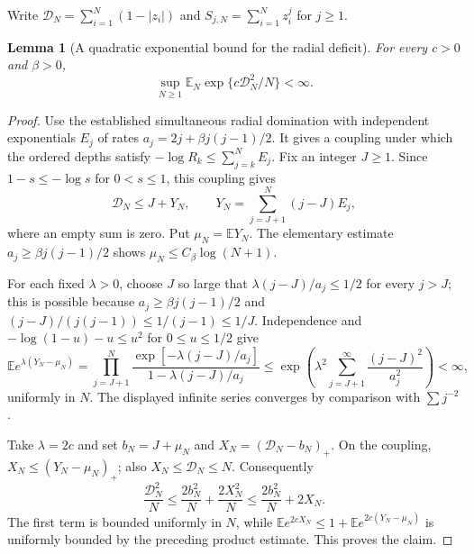 \documentclass[11pt,a4paper]{article}
\numberwithin{equation}{section}
\newtheorem{lemma}[theorem]{Lemma}
\theoremstyle{definition}
\theoremstyle{remark}
\newcommand{\E}{\mathbb E}
\begin{document}
Write $\mathcal D_N=\sum_{i=1}^N(1-|z_i|)$ and
$S_{j,N}=\sum_{i=1}^N z_i^j$ for $j\geq1$.

\begin{lemma}[A quadratic exponential bound for the radial deficit]
\label{lem:deficit-quadratic-exponential}
For every $c>0$ and $\beta>0$,
\[
 \sup_{N\geq1}\E_N\exp\{c\mathcal D_N^2/N\}<\infty.
\]
\end{lemma}
\begin{proof}
Use the established simultaneous radial domination with independent
exponentials $E_j$ of rates $a_j=2j+\beta j(j-1)/2$. It gives a coupling
under which the ordered depths satisfy
$-\log R_k\leq\sum_{j=k}^N E_j$. Fix an integer $J\geq1$. Since
$1-s\leq-\log s$ for $0<s\leq1$, this coupling gives
\[
 \mathcal D_N\leq J+Y_N,
 \qquad Y_N=\sum_{j=J+1}^N(j-J)E_j,
\]
where an empty sum is zero. Put $\mu_N=\E Y_N$. The elementary estimate
$a_j\geq\beta j(j-1)/2$ shows
$\mu_N\leq C_\beta\log(N+1)$.

For each fixed $\lambda>0$, choose $J$ so large that
$\lambda(j-J)/a_j\leq1/2$ for every $j>J$; this is possible because
$a_j\geq\beta j(j-1)/2$ and
$(j-J)/(j(j-1))\leq1/(j-1)\leq1/J$. Independence and
$-\log(1-u)-u\leq u^2$ for $0\leq u\leq1/2$ give
\[
 \E e^{\lambda(Y_N-\mu_N)}
 =\prod_{j=J+1}^N
    \frac{\exp[-\lambda(j-J)/a_j]}
         {1-\lambda(j-J)/a_j}
 \leq\exp\!\left(\lambda^2
        \sum_{j=J+1}^\infty\frac{(j-J)^2}{a_j^2}\right)<\infty,
\]
uniformly in $N$. The displayed infinite series converges by comparison
with $\sum j^{-2}$.

Take $\lambda=2c$ and set $b_N=J+\mu_N$ and
$X_N=(\mathcal D_N-b_N)_+$. On the coupling,
$X_N\leq(Y_N-\mu_N)_+$; also $X_N\leq\mathcal D_N\leq N$.
Consequently
\[
 \frac{\mathcal D_N^2}{N}
 \leq\frac{2b_N^2}{N}+\frac{2X_N^2}{N}
 \leq\frac{2b_N^2}{N}+2X_N.
\]
The first term is bounded uniformly in $N$, while
$\E e^{2cX_N}\leq1+\E e^{2c(Y_N-\mu_N)}$ is uniformly bounded by the
preceding product estimate. This proves the claim.
\end{proof}
\end{document}
